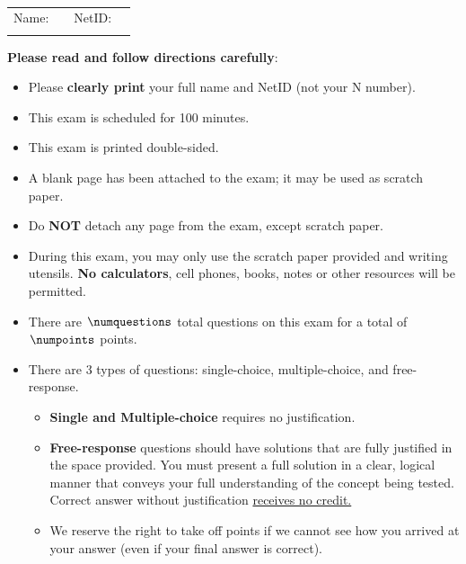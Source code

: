 \documentclass[10pt, addpoints]{exam}
\theoremstyle{definition}
\begin{document}
\addpoints

\extrawidth{.25in}
\usehorizontalhalf
\setlength\topmargin{-.75in}


\begin{titlepage}
\\

\noindent \begin{center}\begin{tabular}{|cccc|}\hline
\large Name: & \hspace{4in} 
&
\large NetID: & \hspace{1in} \\
&&&\\
 \hline
 \end{tabular}\end{center}
\vspace{.3in}
\noindent\textbf{Please read and follow directions carefully}: 

\begin{itemize}
	\setlength\itemsep{0em}
	\item Please \textbf{clearly print} your full name and NetID (not your N number).
	\item This exam is scheduled for 100 minutes.
\item This exam is printed double-sided.
\item A blank page has been attached to the exam; it may be used as scratch paper.
\item Do \textbf{NOT} detach any page from the exam, except scratch paper.
\item During this exam, you may only use the scratch paper provided and writing utensils. \textbf{No calculators}, cell phones, books, notes or other resources will be permitted.
	\item There are $\numquestions$ total questions on this exam for a total of $\numpoints$ points.
	\item There are 3 types of questions: single-choice, multiple-choice, and free-response. 
	\begin{itemize}
	\item \textbf{Single and Multiple-choice} requires no justification. 
	\item \textbf{Free-response} questions should have solutions that are fully justified in the space provided.
	You must present a full solution in a clear, logical manner that conveys your full understanding of the concept being tested. Correct answer without justification \underline{receives no credit.}
	\item We reserve the right to take off points if we cannot see how you arrived at your answer (even if your final answer is correct).
	\end{itemize}




\end{itemize}
\end{titlepage}
\end{document}
